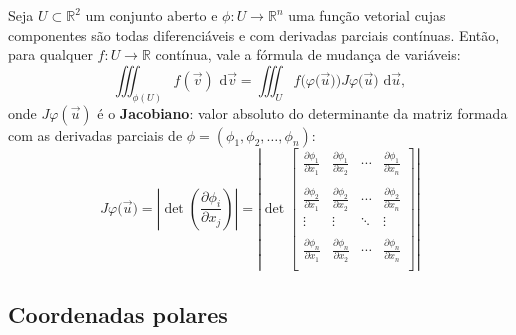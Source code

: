 \documentclass[../livro.tex]{subfiles}  %
\begin{document}
\begin{theorem}
Seja $U \subset \mathbb{R}^2$ um conjunto aberto e $\phi: U \to \mathbb{R}^n$ uma função vetorial cujas componentes são todas diferenciáveis e com derivadas parciais contínuas. Então, para qualquer $f: U \to \mathbb{R}$ contínua, vale a fórmula de mudança de variáveis:
\begin{equation}
\iiint_{\phi (U)}  f(\vec{v}) \, \, \mathrm{d} \vec{v} =  \iiint _{U} f\big(\varphi \big(\vec{u}\big)\big) J\varphi \big(\vec{u}\big) \, \, \mathrm{d}\vec{u},
\end{equation} onde $J\varphi (\vec{u})$ é o \textbf{Jacobiano}: valor absoluto do determinante da matriz formada com as derivadas parciais de $\phi = (\phi_1, \phi_2, \dots, \phi_n)$:
\begin{equation}
J\varphi \big(\vec{u}\big) = \left|
\det \left( \frac{\partial \phi_i}{\partial x_j} \right) 
\right| = \left|
\det 
\begin{bmatrix}
\frac{\partial \phi_1}{\partial x_1} & \frac{\partial \phi_1}{\partial x_2} & \cdots & \frac{\partial \phi_1}{\partial x_n} \\
 &&& \\
\frac{\partial \phi_2}{\partial x_1} & \frac{\partial \phi_2}{\partial x_2} & \cdots & \frac{\partial \phi_2}{\partial x_n} \\
\vdots & \vdots & \ddots & \vdots \\
 &&& \\
\frac{\partial \phi_n}{\partial x_1} & \frac{\partial \phi_n}{\partial x_2} & \cdots & \frac{\partial \phi_n}{\partial x_n} \\
\end{bmatrix}
\right| 
\end{equation}
\end{theorem}


\subsection{Coordenadas polares}
\end{document}
